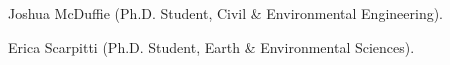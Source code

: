\item Joshua McDuffie (Ph.D. Student, Civil \& Environmental Engineering).
\item Erica Scarpitti (Ph.D. Student, Earth \& Environmental Sciences).

